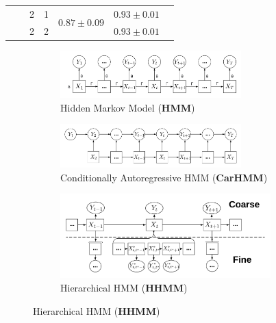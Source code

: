 \begin{table}[ht]
{\begin{tabular}{ccccccc}
                            &                                    & 2                             & 1                                & \multirow{2}{*}{$0.87 \pm 0.09$}    & $0.93 \pm 0.01$                       \\ 
                            &                                    & 2                             & 2                                &                                   & $0.93 \pm 0.01$                       \\ \hline
\end{tabular}
}

\label{table:accuracy}
\end{table}


\begin{figure}[ht]
    \begin{subfigure}{\textwidth}
      \centering
      \includegraphics[width=2.75in]{../Plots/HMM.png}  
      \caption{Hidden Markov Model (\textbf{HMM})}
      \label{fig:HMM}
    \end{subfigure}
    \newline
    \begin{subfigure}{\textwidth}
      \centering
      \includegraphics[width=2.75in]{../Plots/CarHMM.png}  
      \caption{Conditionally Autoregressive HMM (\textbf{CarHMM})}
      \label{fig:CarHMM}
    \end{subfigure}
    \newline
    \begin{subfigure}{\textwidth}
      \centering
      \includegraphics[width=3.2in]{../Plots/HHMM.png}  
      \caption{Hierarchical HMM (\textbf{HHMM})}
      \label{fig:HHMM}

\end{subfigure}
\end{figure}
